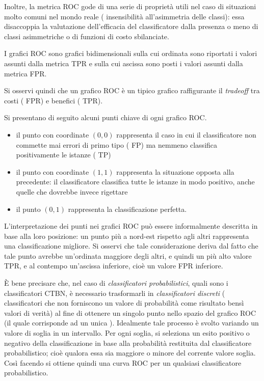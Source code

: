 Inoltre, la metrica \acs{ROC} gode di una serie di proprietà utili nel caso di situazioni molto comuni nel mondo reale (\eg{} insensibilità all'asimmetria delle classi): essa disaccoppia la valutazione dell'efficacia del classificatore dalla presenza o meno di classi asimmetriche o di funzioni di costo sbilanciate.

I grafici \acs{ROC} sono grafici bidimensionali sulla cui ordinata sono riportati i valori assunti dalla metrica \acs{TPR} e sulla cui ascissa sono posti i valori assunti dalla metrica \acs{FPR}.

Si osservi quindi che un grafico \acs{ROC} è un tipico grafico raffigurante il \emph{tradeoff} tra costi (\ie{} \acs{FPR}) e benefici (\ie{} \acs{TPR}).

Si presentano di seguito alcuni punti chiave di ogni grafico \acs{ROC}.
\begin{itemize}
	\item il punto con coordinate $(0,0)$ rappresenta il caso in cui il classificatore non commette mai errori di primo tipo (\ie{} \acf{FP}) ma nemmeno classifica positivamente le istanze (\ie{} \acf{TP})
	\item il punto con coordinate $(1,1)$ rappresenta la situazione opposta alla precedente: il classificatore classifica tutte le istanze in modo positivo, anche quelle che dovrebbe invece rigettare
	\item il punto $(0,1)$ rappresenta la classificazione perfetta.
\end{itemize}
L'interpretazione dei punti nei grafici \acs{ROC} può essere informalmente descritta in base alla loro posizione: un punto più a nord-est rispetto agli altri rappresenta una classificazione migliore. Si osservi che tale considerazione deriva dal fatto che tale punto avrebbe un'ordinata maggiore degli altri, e quindi un più alto valore \acs{TPR}, e al contempo un'ascissa inferiore, cioè un valore \acs{FPR} inferiore.

\`E bene precisare che, nel caso di \emph{classificatori probabilistici}, quali sono i classificatori \acs{CTBN}, è necessario trasformarli in \emph{classificatori discreti} (\ie{} classificatori che non forniscono un valore di probabilità come risultato bensì valori di verità) al fine di ottenere un singolo punto nello spazio del grafico \acs{ROC} (il quale corrisponde ad un unica \emph{}). Idealmente tale processo è svolto variando un valore di soglia in un intervallo. Per ogni soglia, si seleziona un esito positivo o negativo della classificazione in base alla probabilità restituita dal classificatore probabilistico; cioè qualora essa sia maggiore o minore del corrente valore soglia. Così facendo si ottiene quindi una curva \acs{ROC} per un qualsiasi classificatore probabilistico.

